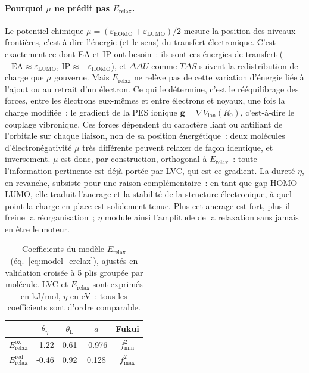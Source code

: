\paragraph{Pourquoi $\mu$ ne prédit pas $E_{\text{relax}}$.}
Le potentiel chimique $\mu = (\varepsilon_{\text{HOMO}} + \varepsilon_{\text{LUMO}})/2$ mesure la position des niveaux frontières, c'est-à-dire l'énergie (et le sens) du transfert électronique. C'est exactement ce dont EA et IP ont besoin~: ils sont ces énergies de transfert ($-\text{EA} \approx \varepsilon_{\text{LUMO}}$, $\text{IP} \approx -\varepsilon_{\text{HOMO}}$), et $\Delta\Delta U$ comme $T\Delta S$ suivent la redistribution de charge que $\mu$ gouverne. Mais $E_{\text{relax}}$ ne relève pas de cette variation d'énergie liée à l'ajout ou au retrait d'un électron. Ce qui le détermine, c'est le rééquilibrage des forces, entre les électrons eux-mêmes et entre électrons et noyaux, une fois la charge modifiée~: le gradient de la PES ionique $\boldsymbol{g} = \nabla V_{\text{ion}}(R_0)$, c'est-à-dire le couplage vibronique. Ces forces dépendent du caractère liant ou antiliant de l'orbitale sur chaque liaison, non de sa position énergétique~: deux molécules d'électronégativité $\mu$ très différente peuvent relaxer de façon identique, et inversement. $\mu$ est donc, par construction, orthogonal à $E_{\text{relax}}$~: toute l'information pertinente est déjà portée par LVC, qui est ce gradient. La dureté $\eta$, en revanche, subsiste pour une raison complémentaire~: en tant que gap HOMO--LUMO, elle traduit l'ancrage et la stabilité de la structure électronique, à quel point la charge en place est solidement tenue. Plus cet ancrage est fort, plus il freine la réorganisation~; $\eta$ module ainsi l'amplitude de la relaxation sans jamais en être le moteur.

\begin{table}[H]
\centering
\caption{Coefficients du modèle $E_{\text{relax}}$ (éq.~\ref{eq:model_erelax}), ajustés en validation croisée à 5 plis groupée par molécule. LVC et $E_{\text{relax}}$ sont exprimés en kJ/mol, $\eta$ en eV~: tous les coefficients sont d'ordre comparable.}
\label{tab:coefs_erelax}
\footnotesize
\begin{tabular}{l S[table-format=-1.2] S[table-format=-1.2] S[table-format=-1.3] c}
\toprule
 & {$\theta_\eta$} & {$\theta_{\text{L}}$} & {$a$} & \textbf{Fukui} \\
\midrule
$E_{\text{relax}}^{\text{ox}}$  & -1.22 & 0.61 & -0.976 & $f^2_{\min}$ \\
$E_{\text{relax}}^{\text{red}}$ & -0.46 & 0.92 &  0.128 & $f^2_{\max}$ \\
\bottomrule
\end{tabular}
\end{table}

